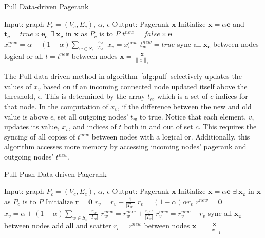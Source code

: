 \documentclass[letterpaper,12pt,onecolumn]{article}
\begin{document}
\begin{algorithm}
\caption{Pull Data-driven Pagerank}
\label{alg:pull}
\begin{algorithmic}[1]
  \STATE Input: graph $P_{c} = (V_c, E_c)$, $\alpha$, $\epsilon$
  \STATE Output: Pagerank $\mathbf{x}$
  \STATE Initialize $\mathbf{x} = \alpha \mathbf{e}$ and $\mathbf{t_c} = true \times \mathbf{e_c}$
  \STATE $\exists  \medspace \mathbf{x_c}$ in $\mathbf{x}$ as $P_c$ is to $P$
	\STATE $t^{new} = false \times \mathbf{e}$
			\STATE $x_{v}^{new} = \alpha + (1 - \alpha) \sum_{w \in S_v} \frac{x_{w}}{|T_w|} $
				\STATE $x_v = x_v^{new}$
					\STATE $t_w^{new} = true$
				\ENDFOR
			\ENDIF
		\ENDIF
	\ENDFOR
	\STATE sync all $\mathbf{x_c}$ between nodes
	\STATE logical or all $t = t^{new}$ between nodes
  \ENDWHILE
  \STATE $\mathbf{x} = \frac{\mathbf{x} }{\|x\|_{1}}$
\end{algorithmic}
\end{algorithm}


The Pull data-driven method in algorithm~\ref{alg:pull} selectively updates the values of $x_v$ based on if an incoming connected node updated itself above the threshold, $\epsilon$. This is determined by the array $t_c$, which is a set of $c$ indices for that node. In the computation of $x_v$, if the difference between the new and old value is above $\epsilon$, set all outgoing nodes' $t_w$ to true. Notice that each element, $v$, updates its value, $x_v$, and indices of $t$ both in and out of set $c$. This requires the syncing of all copies of $t^{new}$ between nodes with a logical or. Additionally, this algorithm accesses more memory by accessing incoming nodes' pagerank and outgoing nodes' $t^{new}$.

\begin{algorithm}
\caption{Pull-Push Data-driven Pagerank}
\label{alg:pullpush}
\begin{algorithmic}[1]
  \STATE Input: graph $P_{c} = (V_c, E_c)$, $\alpha$, $\epsilon$
  \STATE Output: Pagerank $\mathbf{x}$
  \STATE Initialize $\mathbf{x} = \alpha \mathbf{e}$
  \STATE $\exists  \medspace \mathbf{x_c}$ in $\mathbf{x}$ as $P_c$ is to $P$
  \STATE Initialize $\mathbf{r} = \mathbf{0}$
		\STATE $r_v = r_v + \frac{1}{|T_w|}$
	\ENDFOR
	\STATE $r_v = (1 - \alpha)\alpha r_v$
  \ENDFOR
	\STATE $r^{new} = \mathbf{0}$
			\STATE $x_{v} = \alpha + (1 - \alpha) \sum_{w \in S_v} \frac{x_{w}}{|T_w|} $
				\STATE $r_w^{new} = r_w^{new} + \frac{r_v \alpha}{|T_v|}$
			\ENDFOR
		\ELSE
			\STATE $r_v^{new} = r_v^{new} + r_v$
		\ENDIF
	\ENDFOR
	\STATE sync all $\mathbf{x_c}$ between nodes
	\STATE add all and scatter $ r_c = r^{new}$ between nodes
  \ENDWHILE
  \STATE $\mathbf{x} = \frac{\mathbf{x} }{\|x\|_{1}}$
\end{algorithmic}
\end{algorithm}
\end{document}
